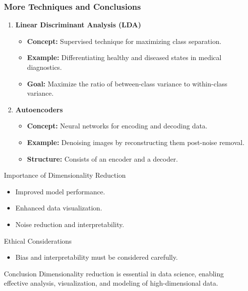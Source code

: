 \documentclass[aspectratio=169]{beamer}
\begin{document}
\begin{frame}[fragile]
    \frametitle{More Techniques and Conclusions}
    \begin{enumerate}[resume]
        \item \textbf{Linear Discriminant Analysis (LDA)}
            \begin{itemize}
                \item \textbf{Concept:} Supervised technique for maximizing class separation.
                \item \textbf{Example:} Differentiating healthy and diseased states in medical diagnostics.
                \item \textbf{Goal:} Maximize the ratio of between-class variance to within-class variance.
            \end{itemize}
            
        \item \textbf{Autoencoders}
            \begin{itemize}
                \item \textbf{Concept:} Neural networks for encoding and decoding data.
                \item \textbf{Example:} Denoising images by reconstructing them post-noise removal.
                \item \textbf{Structure:} Consists of an encoder and a decoder.
            \end{itemize}
    \end{enumerate}

    \begin{block}{Importance of Dimensionality Reduction}
        \begin{itemize}
            \item Improved model performance.
            \item Enhanced data visualization.
            \item Noise reduction and interpretability.
        \end{itemize}
    \end{block}
    
    \begin{block}{Ethical Considerations}
        \begin{itemize}
            \item Bias and interpretability must be considered carefully.
        \end{itemize}
    \end{block}
    
    \begin{block}{Conclusion}
        Dimensionality reduction is essential in data science, enabling effective analysis, visualization, and modeling of high-dimensional data.
    \end{block}
\end{frame}
\end{document}
